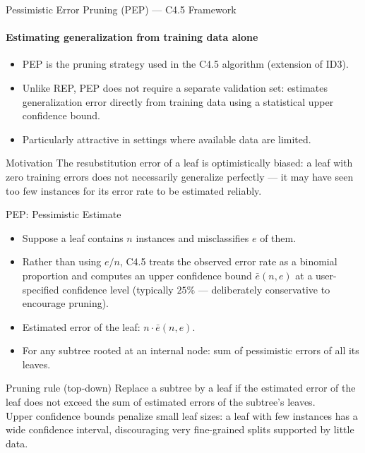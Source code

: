 \begin{frame}{Pessimistic Error Pruning (PEP) — C4.5 Framework}
  \framesubtitle{Estimating generalization from training data alone}
  \begin{itemize}
    \item PEP is the pruning strategy used in the \alert{C4.5} algorithm (extension of ID3).
    \item Unlike REP, PEP \alert{does not require a separate validation set}: estimates generalization
          error directly from training data using a \alert{statistical upper confidence bound}.
    \item Particularly attractive in settings where available data are \alert{limited}.
  \end{itemize}
  \begin{block}{Motivation}
    The resubstitution error of a leaf is \alert{optimistically biased}: a leaf with zero training
    errors does not necessarily generalize perfectly — it may have seen too few instances for its
    error rate to be estimated reliably.
  \end{block}
\end{frame}

\begin{frame}{PEP: Pessimistic Estimate}
  \begin{itemize}
    \item Suppose a leaf contains $n$ instances and misclassifies $e$ of them.
    \item Rather than using $e/n$, C4.5 treats the observed error rate as a binomial proportion
          and computes an \alert{upper confidence bound} $\bar{e}(n,e)$ at a user-specified
          confidence level (typically $25\%$ — deliberately conservative to encourage pruning).
    \item Estimated error of the leaf: $n \cdot \bar{e}(n, e)$.
    \item For any subtree rooted at an internal node: sum of pessimistic errors of all its leaves.
  \end{itemize}
  \begin{block}{Pruning rule (top-down)}
    Replace a subtree by a leaf if the \alert{estimated error of the leaf} does not exceed the
    sum of estimated errors of the subtree's leaves.\\
    Upper confidence bounds penalize \alert{small leaf sizes}: a leaf with few instances has a
    wide confidence interval, discouraging very fine-grained splits supported by little data.
  \end{block}
\end{frame}

